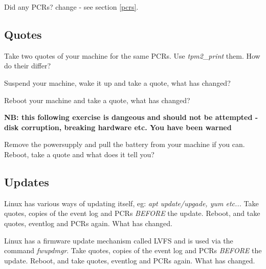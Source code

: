 \documentclass[11pt,a4paper]{article}
\begin{document}
Did any PCRs? change - see section \ref{pcrs}.

\subsection{Quotes}
Take two quotes of your machine for the same PCRs. Use \textit{tpm2\_print} them. How do their differ?

Suspend your machine, wake it up and take a quote, what has changed?

Reboot your machine and take a quote, what has changed?

\textbf{NB: this following exercise is dangeous and should not be attempted - disk corruption, breaking hardware etc. You have been warned}

Remove the powersupply and pull the battery from your machine if you can. Reboot, take a quote and what does it tell you?

\subsection{Updates}
Linux has various ways of updating itself, eg: \textit{apt update/upgade, yum etc...} Take quotes, copies of the event log and PCRs \textit{BEFORE} the update. Reboot, and take quotes, eventlog and PCRs again.  What has changed.

Linux has a firmware update mechanism called LVFS and is used via the command \textit{fwupdmgr}. Take quotes, copies of the event log and PCRs \textit{BEFORE} the update. Reboot, and take quotes, eventlog and PCRs again.  What has changed.
\end{document}
